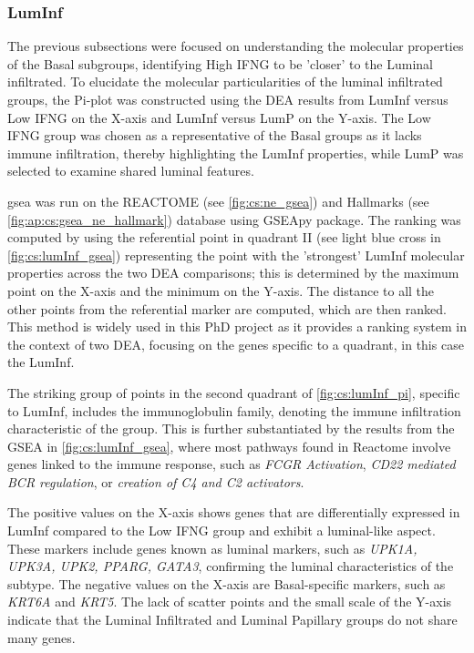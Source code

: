 \subsubsection{LumInf} \label{s:cs:lumInf_interp}

The previous subsections were focused on understanding the molecular properties of the Basal subgroups, identifying High IFNG to be 'closer' to the Luminal infiltrated. To elucidate the molecular particularities of the luminal infiltrated groups, the Pi-plot was constructed using the DEA results from LumInf versus Low IFNG on the X-axis and LumInf versus LumP on the Y-axis. The Low IFNG group was chosen as a representative of the Basal groups as it lacks immune infiltration, thereby highlighting the LumInf properties, while LumP was selected to examine shared luminal features.

\acrfull{gsea} was run on the REACTOME (see \cref{fig:cs:ne_gsea}) and Hallmarks (see \ref{fig:ap:cs:gsea_ne_hallmark}) database using GSEApy \citet{Fang2023-ec} package. The ranking was computed by using the referential point in quadrant II (see light blue cross in \cref{fig:cs:lumInf_gsea}) representing the point with the 'strongest' LumInf molecular properties across the two DEA comparisons; this is determined by the maximum point on the X-axis and the minimum on the Y-axis. The distance to all the other points from the referential marker are computed, which are then ranked. This method is widely used in this PhD project as it provides a ranking system in the context of two DEA, focusing on the genes specific to a quadrant, in this case the LumInf. 

The striking group of points in the second quadrant of \cref{fig:cs:lumInf_pi}, specific to LumInf, includes the immunoglobulin family, denoting the immune infiltration characteristic of the group. This is further substantiated by the results from the GSEA in \cref{fig:cs:lumInf_gsea}, where most pathways found in Reactome involve genes linked to the immune response, such as \textit{FCGR Activation}, \textit{CD22 mediated BCR regulation}, or \textit{creation of C4 and C2 activators}.


The positive values on the X-axis shows genes that are differentially expressed in LumInf compared to the Low IFNG group and exhibit a luminal-like aspect. These markers include genes known as luminal markers, such as \textit{UPK1A, UPK3A, UPK2, PPARG, GATA3}, confirming the luminal characteristics of the subtype. The negative values on the X-axis are Basal-specific markers, such as \textit{KRT6A} and \textit{KRT5}. The lack of scatter points and the small scale of the Y-axis indicate that the Luminal Infiltrated and Luminal Papillary groups do not share many genes.

